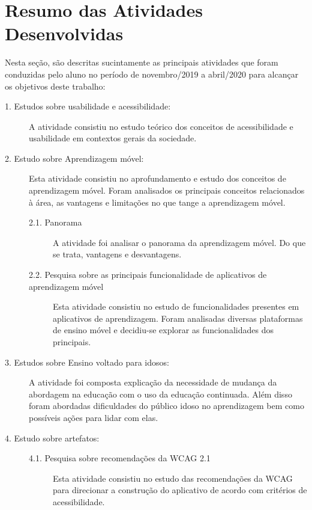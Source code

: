 \chapter{Resumo das Atividades Desenvolvidas} \label{sec:resumo_ativ}
Nesta seção, são descritas sucintamente as principais atividades que foram conduzidas pelo aluno no período de novembro/2019 a abril/2020 para alcançar os objetivos deste trabalho:

\begin{description}
\item[1. Estudos sobre usabilidade e acessibilidade:]
A atividade consistiu no estudo teórico dos conceitos de acessibilidade e usabilidade em contextos gerais da sociedade.

\item[2. Estudo sobre Aprendizagem móvel:] Esta atividade consistiu no aprofundamento e estudo dos conceitos de aprendizagem móvel. Foram analisados os principais conceitos relacionados à área, as vantagens e limitações no que tange a aprendizagem móvel. 

\begin{description}
    \item[2.1. Panorama]
    A atividade foi analisar o panorama da aprendizagem móvel. Do que se trata, vantagens e desvantagens.
    
    \item[2.2. Pesquisa sobre as principais funcionalidade de aplicativos de aprendizagem móvel]
    Esta atividade consistiu no estudo de funcionalidades presentes em aplicativos de aprendizagem. Foram analisadas diversas plataformas de ensino móvel e decidiu-se explorar as funcionalidades dos principais.
\end{description}

\item[3. Estudos sobre Ensino voltado para idosos:]
A atividade foi composta explicação da necessidade de mudança da abordagem na educação com o uso da educação continuada. Além disso foram abordadas dificuldades do público idoso no aprendizagem bem como possíveis ações para lidar com elas.

\item[4. Estudo sobre artefatos:]
\hfill

\begin{description}
    \item[4.1. Pesquisa sobre recomendações da WCAG 2.1]
    Esta atividade consistiu no estudo das recomendações da WCAG para direcionar a construção do aplicativo de acordo com critérios de acessibilidade.
    

\end{description}
\end{description}
